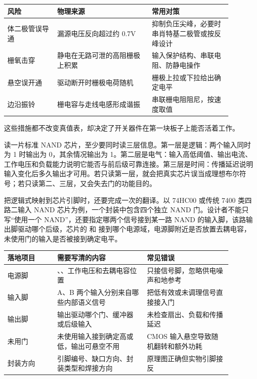 \begin{longtable}{L{0.2\linewidth}L{0.38\linewidth}L{0.32\linewidth}}
\toprule
风险 & 物理来源 & 常用对策 \\
\midrule
体二极管误导通 & 漏源电压反向超过约 0.7V & 抑制负压尖峰，必要时串肖特基二极管或按反峰设计 \\
栅氧击穿 & 静电在无路可泄的高阻栅极上积累 & 输入保护结构、串联电阻、防静电操作 \\
悬空误开通 & 驱动断开时栅极电荷随机 & 栅极上拉或下拉给出确定电平 \\
边沿振铃 & 栅电容与走线电感形成谐振 & 串联栅电阻阻尼，按速度取值 \\
\bottomrule
\end{longtable}

这些措施都不改变真值表，却决定了开关器件在第一块板子上能否活着工作。

\begin{chipcase}
读一片标准 NAND 芯片，至少要同时读三层信息。第一层是逻辑：两个输入同时为 1 时输出为 0，其余情况输出为 1。第二层是电气：输入高低阈值、输出电流、工作电压和负载能力说明它能否与前后级可靠连接。第三层是时间：传播延迟说明输入变化后多久输出才可用。若只读第一层，就会把真实芯片误当成理想布尔符号；若只读第二、三层，又会失去门的功能目的。
\end{chipcase}

把逻辑式映射到芯片引脚时，还要完成一次的翻译。以 74HC00 或传统 7400 类四路二输入 NAND 芯片为例，一个封装中包含四个独立 NAND 门。设计者不能只写“使用一个 NAND”，还要指定哪两个信号接到某一路 NAND 的输入脚，该路输出脚驱动哪个后级，芯片的  和  接到哪个电源域，电源脚附近是否放置去耦电容，未使用门的输入是否被接到确定电平。

\begin{longtable}{L{0.2\linewidth}L{0.36\linewidth}L{0.34\linewidth}}
\toprule
落地项目 & 需要写清的内容 & 常见错误 \\
\midrule
电源脚 & 、、工作电压和去耦电容位置 & 只接信号脚，忽略供电噪声和地参考 \\
输入脚 & A、B 两个输入分别来自哪些内部语义信号 & 把低有效或未调理信号直接接入门 \\
输出脚 & 输出驱动哪个门、缓冲器或后级输入 & 未检查扇出、负载和传播延迟 \\
未用门 & 未使用输入接到确定高或低，输出可悬空不用 & CMOS 输入悬空导致随机翻转和额外功耗 \\
封装方向 & 引脚编号、缺口方向、封装类型和焊接方向 & 原理图正确但实物引脚接反 \\
\bottomrule
\end{longtable}

